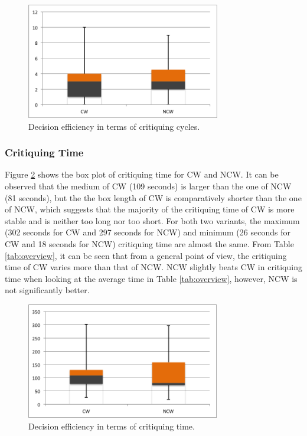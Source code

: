 \begin{figure}[H]
	\centering
	\includegraphics[height=2in]{figures/critiquingCycles.png}
	\caption{Decision efficiency in terms of critiquing cycles.}
	\label{fig:critiquingCycles}
\end{figure}

\subsubsection{Critiquing Time} \label{sec:results_de_ct}

Figure \ref{fig:critiquingTime} shows the box plot of critiquing time for CW and NCW. It can be observed that the medium of CW (109 seconds) is larger than the one of NCW (81 seconds), but the the box length of CW is comparatively shorter than the one of NCW, which suggests that the majority of the critiquing time of CW is more stable and is neither too long nor too short. For both two variants, the maximum (302 seconds for CW and 297 seconds for NCW) and minimum  (26 seconds for CW and 18 seconds for NCW) critiquing time are almost the same. 
From Table \ref{tab:overview}, it can be seen that from a general point of view, the critiquing time of CW varies more than that of NCW. NCW slightly beats CW in critiquing time when looking at the average time in Table \ref{tab:overview}, however, NCW is not significantly better.

\begin{figure}[H]
	\centering
	\includegraphics[height=2in]{figures/critiquingTime.png}
	\caption{Decision efficiency in terms of critiquing time.}
	\label{fig:critiquingTime}
\end{figure}

